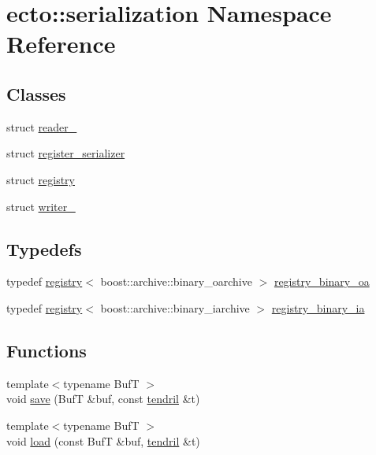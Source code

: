 \hypertarget{namespaceecto_1_1serialization}{}\section{ecto\+:\+:serialization Namespace Reference}
\label{namespaceecto_1_1serialization}
\subsection*{Classes}
\begin{DoxyCompactItemize}
\item 
struct \hyperlink{structecto_1_1serialization_1_1reader__}{reader\+\_\+}
\item 
struct \hyperlink{structecto_1_1serialization_1_1register__serializer}{register\+\_\+serializer}
\item 
struct \hyperlink{structecto_1_1serialization_1_1registry}{registry}
\item 
struct \hyperlink{structecto_1_1serialization_1_1writer__}{writer\+\_\+}
\end{DoxyCompactItemize}
\subsection*{Typedefs}
\begin{DoxyCompactItemize}
\item 
typedef \hyperlink{structecto_1_1serialization_1_1registry}{registry}$<$ boost\+::archive\+::binary\+\_\+oarchive $>$ \hyperlink{namespaceecto_1_1serialization_ad544c8b5416e0ecfe692922b2f2e8e54}{registry\+\_\+binary\+\_\+oa}
\item 
typedef \hyperlink{structecto_1_1serialization_1_1registry}{registry}$<$ boost\+::archive\+::binary\+\_\+iarchive $>$ \hyperlink{namespaceecto_1_1serialization_a465425ff3a756de86571c1262f22d2ba}{registry\+\_\+binary\+\_\+ia}
\end{DoxyCompactItemize}
\subsection*{Functions}
\begin{DoxyCompactItemize}
\item 
{\footnotesize template$<$typename BufT $>$ }\\void \hyperlink{namespaceecto_1_1serialization_a77b3e77a54adf1a888736007260a9343}{save} (BufT \&buf, const \hyperlink{classecto_1_1tendril}{tendril} \&t)
\item 
{\footnotesize template$<$typename BufT $>$ }\\void \hyperlink{namespaceecto_1_1serialization_a1960d58009e397c926055229f8e1c347}{load} (const BufT \&buf, \hyperlink{classecto_1_1tendril}{tendril} \&t)
\end{DoxyCompactItemize}


